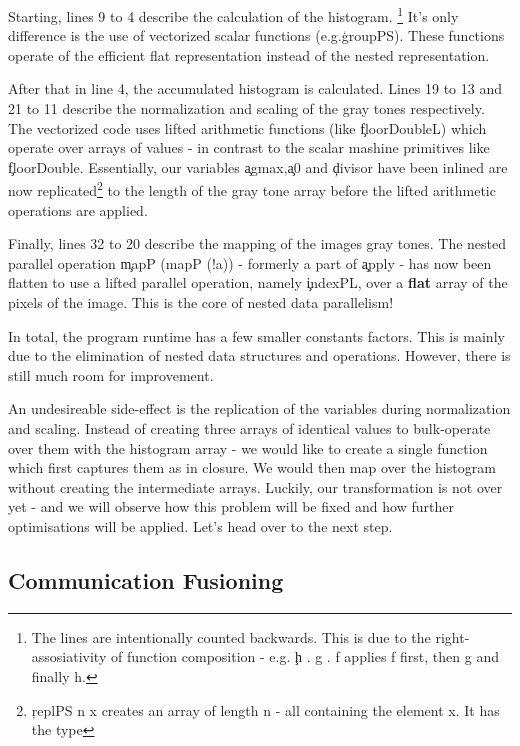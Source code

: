       Starting, lines 9 to 4 describe the calculation of the histogram.
      \footnote[1]{The lines are intentionally counted backwards. This is due to the right-assosiativity of function composition - e.g. \c{h . g . f} applies f first, then g and finally h.}
      It's only difference is the use of vectorized scalar functions (e.g.\c{groupPS}). These functions operate of the efficient flat
      representation instead of the nested representation.
      
      
      After that in line 4, the accumulated histogram is calculated. Lines 19 to 13 and 21 to 11
      describe the normalization and scaling of the gray tones respectively. The vectorized code uses
      lifted arithmetic functions (like \c{floorDoubleL}) which operate over arrays of values - in contrast to
      the scalar mashine primitives like \c{floorDouble}. Essentially, our variables \c{agmax},\c{a0} and \c{divisor}
      have been inlined are now replicated\footnote[2]{\c{replPS n x} creates an array of length n - all containing the element x. It has the type }
      to the length of the gray tone array before the lifted arithmetic operations are applied.
      
      
      Finally, lines 32 to 20 describe the mapping of the images gray tones.
      The nested parallel operation \c{mapP (mapP (!a))} - formerly a part of \c{apply} - 
      has now been flatten to use a lifted parallel operation, namely \c{indexPL}, over a \textbf{flat} array of
      the pixels of the image. This is the core of nested data parallelism!
      
      In total, the program runtime has a few smaller constants factors. This is mainly due to the elimination of nested data structures
      and operations. However, there is still much room for improvement.
      
      An undesireable side-effect
      is the replication of the variables during normalization and scaling. Instead of creating three arrays of identical values
      to bulk-operate over them with the histogram array - we would like to create a single function which first
      captures them as in closure. We would then map over the histogram without creating the intermediate arrays.
      Luckily, our transformation is not over yet - and we will observe how this problem will be fixed and how further optimisations will be applied.
      Let's head over to the next step.
      
    \subsection{Communication Fusioning}
      
